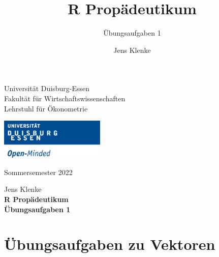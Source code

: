 \documentclass[12pt,a4paper]{article}
\title{R Propädeutikum}
\subtitle{Übungsaufgaben 1}
\author{Jens Klenke}
\date{}
\begin{document}





\restoregeometry



\begin{minipage}{0.6\textwidth}
Universität Duisburg-Essen\\
Fakultät für Wirtschaftswissenschaften\\
Lehrstuhl für Ökonometrie\\
\end{minipage}

	\begin{flushright}
	\vspace{-3cm}
	\includegraphics*[width=5cm]{includes/duelogo_en.png}\\
	\vspace{.125cm}
	\end{flushright}
\hspace{-0.005cm}Sommersemester 2022

\vspace{0.05cm}

\begin{center}
	\vspace{.25cm}
	Jens Klenke \hspace{.5cm}  \\
	\vspace{.25cm}
	\textbf{\Large{R Propädeutikum}}\\
	\vspace{.25cm}
	\textbf{\large{Übungsaufgaben 1}}\\
	\vspace{.125cm}
\end{center}





\hypertarget{uxfcbungsaufgaben-zu-vektoren}{%
\section{Übungsaufgaben zu
Vektoren}\label{uxfcbungsaufgaben-zu-vektoren}}
\end{document}
